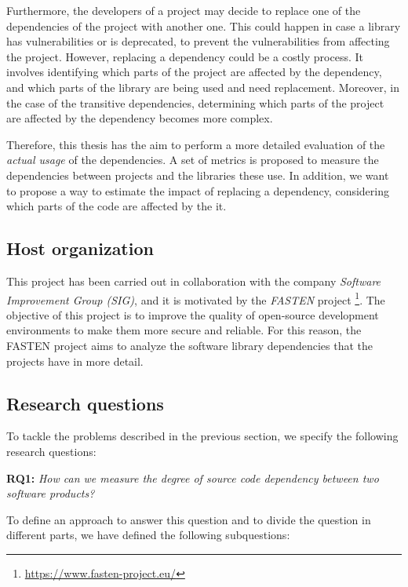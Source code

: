 Furthermore, the developers of a project may decide to replace one of the dependencies of the project with another one. This could happen in case a library has vulnerabilities or is deprecated, to prevent the vulnerabilities from affecting the project. However, replacing a dependency could be a costly process. It involves identifying which parts of the project are affected by the dependency, and which parts of the library are being used and need replacement. Moreover, in the case of the transitive dependencies, determining which parts of the project are affected by the dependency becomes more complex.

\blankl
Therefore, this thesis has the aim to perform a more detailed evaluation of the \textit{actual usage} of the dependencies. A set of metrics is proposed to measure the dependencies between projects and the libraries these use. In addition, we want to propose a way to estimate the impact of replacing a dependency, considering which parts of the code are affected by the it.

\subsection{Host organization}
This project has been carried out in collaboration with the company \textit{Software Improvement Group (SIG)}, and it is motivated by the \textit{FASTEN} project \footnote{\url{https://www.fasten-project.eu/}}. The objective of this project is to improve the quality of open-source development environments to make them more secure and reliable. For this reason, the FASTEN project aims to analyze the software library dependencies that the projects have in more detail.

\subsection{Research questions}
To tackle the problems described in the previous section, we specify the following research questions:

\blankl
\textbf{RQ1:} \textit{How can we measure the degree of source code dependency between two software products?}

To define an approach to answer this question and to divide the question in different parts, we have defined the following subquestions:

